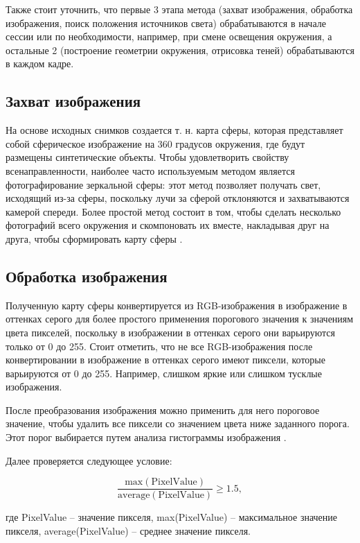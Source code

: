 Также стоит уточнить, что первые 3 этапа метода (захват изображения, обработка изображения, поиск положения источников света) обрабатываются в начале сессии или по необходимости, например, при смене освещения окружения, а остальные 2 (построение геометрии окружения, отрисовка теней) обрабатываются в каждом кадре.

\subsection{Захват изображения}

На основе исходных снимков создается т. н. карта сферы, которая представляет собой сферическое изображение на 360 градусов окружения, где будут размещены синтетические объекты. Чтобы удовлетворить свойству всенаправленности, наиболее часто используемым методом является фотографирование зеркальной сферы: этот метод позволяет получать свет, исходящий из-за сферы, поскольку лучи за сферой отклоняются и захватываются камерой спереди. Более простой метод состоит в том, чтобы сделать несколько фотографий всего окружения и скомпоновать их вместе, накладывая друг на друга, чтобы сформировать карту сферы \cite{osti2019real}.

\subsection{Обработка изображения}

Полученную карту сферы конвертируется из RGB-изображения в изображение в оттенках серого для более простого применения порогового значения к значениям цвета пикселей, поскольку в изображении в оттенках серого они варьируются только от 0 до 255. Стоит отметить, что не все RGB-изображения после конвертировании в изображение в оттенках серого имеют пиксели, которые варьируются от 0 до 255. Например, слишком яркие или слишком тусклые изображения.

После преобразования изображения можно применить для него пороговое значение, чтобы удалить все пиксели со значением цвета ниже заданного порога. Этот порог выбирается путем анализа гистограммы изображения \cite{img_hists}.

Далее проверяется следующее условие:

\begin{equation}
	\frac{\text{max}(\text{PixelValue})}{\text{average}(\text{PixelValue})} \geq 1.5,
\end{equation}

где PixelValue -- значение пикселя, max(PixelValue) -- максимальное значение пикселя, average(PixelValue) -- среднее значение пикселя.

